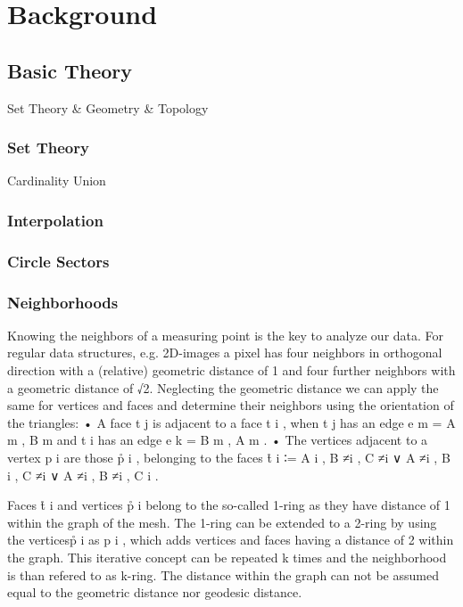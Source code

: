 \chapter{Background}
\section{}
%
%
%
%
%
%
\section{Basic Theory}
Set Theory \& Geometry \& Topology
\subsection{Set Theory}
Cardinality
Union
%
\subsection{Interpolation}
%
\subsection{Circle Sectors}
%
\subsection{Neighborhoods}
Knowing the neighbors of a measuring point is the key to analyze our data. For regular data structures, e.g. 2D-images a pixel has four neighbors in orthogonal direction with a (relative) geometric distance of 1 and four further neighbors with a geometric distance of √2. Neglecting the geometric distance we can apply the same for vertices and faces and determine their neighbors using the orientation of the triangles:
• A face t j is adjacent to a face t i , when t j has an edge e m = {A m , B m }and t i has an edge e k = {B m , A m }.
• The vertices adjacent to a vertex p i are those p̊ i , belonging to the faces t̊ i ∶= {A i , B ≠i , C ≠i } ∨ {A ≠i , B i , C ≠i } ∨ {A ≠i , B ≠i , C i }.

Faces t̊ i and vertices p̊ i belong to the so-called 1-ring as they have distance of 1 within the graph of the mesh. The 1-ring can be extended to a 2-ring by using the verticesp̊ i as p i , which adds vertices and faces having a distance of 2 within the graph. This iterative concept can be repeated k times and the neighborhood is than refered to as k-ring. The distance within the graph can not be assumed equal to the geometric distance nor geodesic distance.

